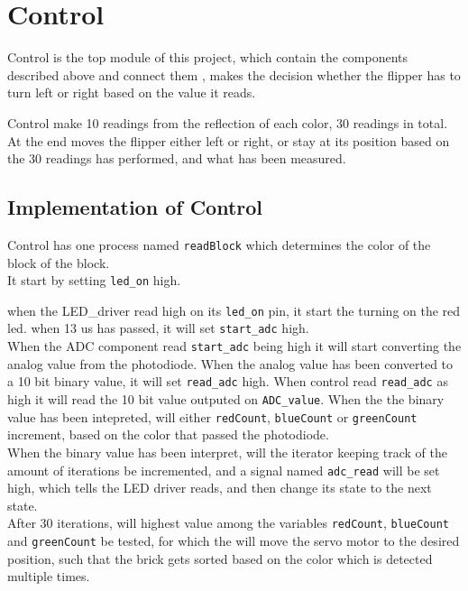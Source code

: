 \section{Control}
Control is the top module of this project, which contain the components described above and connect them , makes the decision whether the flipper has to turn left or right based on the value it reads.

Control make 10 readings from the reflection of each color,  30 readings in total. At the end moves the flipper either left or right, or stay at its position based on the 30 readings has performed, and what has been measured. 

\subsection{Implementation of Control}


Control has  one process named \texttt{readBlock} which determines the color of the block of the block. \\


It start by setting \texttt{led\_on} high.  %

when the LED\_driver read high  on its \texttt{led\_on} pin, it start the turning on the red led.  when 13 us has passed, it will set \texttt{start\_adc} high.  \\

When the ADC component read \texttt{start\_adc} being high it will start converting the analog value from the photodiode.  When the analog value has been converted to a 10 bit binary value, it will set \texttt{read\_adc} high. When control read \texttt{read\_adc} as high it will read the 10 bit value outputed on \texttt{ADC\_value}. When the the binary value has been intepreted, will either \texttt{redCount}, \texttt{blueCount} or \texttt{greenCount} increment, based on the color that passed the photodiode.  \\


When the binary value has been interpret, will the iterator keeping track of the amount of iterations be incremented,  and a signal named \texttt{adc\_read} will be set high, which tells the LED driver reads, and then change its state to the next state.\\


After 30 iterations,  will highest value among the variables \texttt{redCount}, \texttt{blueCount} and \texttt{greenCount} be tested, for which the will move the servo motor to the desired position, such that the brick gets sorted based on the color which is detected multiple times. 


